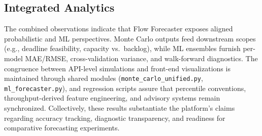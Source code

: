 \subsection{Integrated Analytics}
The combined observations indicate that Flow Forecaster exposes aligned probabilistic and ML perspectives. Monte Carlo outputs feed downstream scopes (e.g., deadline feasibility, capacity vs.\ backlog), while ML ensembles furnish per-model MAE/RMSE, cross-validation variance, and walk-forward diagnostics. The congruence between API-level simulations and front-end visualizations is maintained through shared modules (\texttt{monte\_carlo\_unified.py}, \texttt{ml\_forecaster.py}), and regression scripts assure that percentile conventions, throughput-derived feature engineering, and advisory systems remain synchronized. Collectively, these results substantiate the platform's claims regarding accuracy tracking, diagnostic transparency, and readiness for comparative forecasting experiments.
